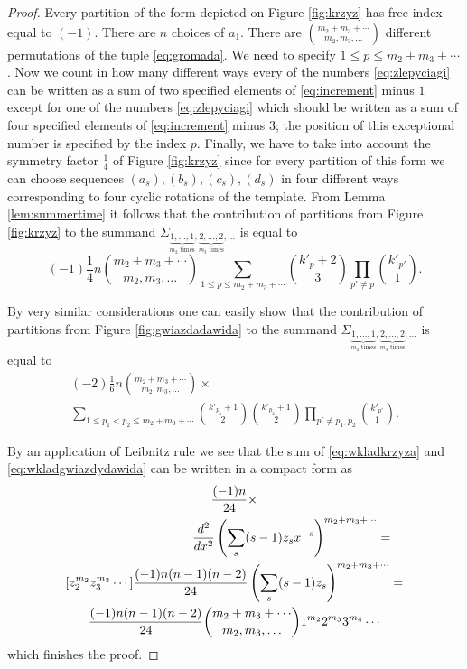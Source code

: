 \documentclass[12pt,dvips]{amsart}
\numberwithin{equation}{section} \numberwithin{figure}{section}
\theoremstyle{plain}
\theoremstyle{definition}
\theoremstyle{remark}
\begin{document}
\begin{proof}
Every partition of the form depicted on Figure \ref{fig:krzyz} has
free index equal to $(-1)$. There are $n$ choices of $a_1$. There
are $\binom{m_2+m_3+\cdots}{m_2,m_3,\dots}$ different permutations
of the tuple \eqref{eq:gromada}. We need to specify $1\leq p\leq
m_2+m_3+\cdots$. Now we count in how many different ways every of
the numbers \eqref{eq:zlepyciagi} can be written as a sum of two
specified elements of \eqref{eq:increment} minus $1$ except for one
of the numbers \eqref{eq:zlepyciagi} which should be written as a
sum of four specified elements of \eqref{eq:increment} minus $3$;
the position of this exceptional number is specified by the index
$p$. Finally, we have to take into account the symmetry factor
$\frac{1}{4}$ of Figure \ref{fig:krzyz} since for every partition of
this form we can choose sequences $(a_s),(b_s),(c_s),(d_s)$ in four
different ways corresponding to four cyclic rotations of the
template. From Lemma \ref{lem:summertime} it follows that the
contribution of partitions from Figure \ref{fig:krzyz} to the
summand $\Sigma_{\underbrace{1,\dots,1}_{m_2\text{ times}},
\underbrace{2,\dots,2}_{m_3\text{ times}},\dots}$ is equal to
\begin{equation}
\label{eq:wkladkrzyza}(-1) \frac{1}{4} n
\binom{m_2+m_3+\cdots}{m_2,m_3,\dots} \sum_{1\leq p \leq
m_2+m_3+\cdots} \binom{k'_p+2}{3} \prod_{p'\neq p}
\binom{k'_{p'}}{1}.
\end{equation}

By very similar considerations one can easily show that the
contribution of partitions from Figure \ref{fig:gwiazdadawida} to
the summand $\Sigma_{\underbrace{1,\dots,1}_{m_2\text{ times}},
\underbrace{2,\dots,2}_{m_3\text{ times}},\dots}$ is equal to
\begin{multline}
\label{eq:wkladgwiazdydawida}
(-2)\frac{1}{6} n \binom{m_2+m_3+\cdots}{m_2,m_3,\dots} \times \\
\sum_{1\leq p_1<p_2 \leq m_2+m_3+\cdots} \binom{k'_{p_1}+1}{2}
\binom{k'_{p_2}+1}{2} \prod_{p'\neq p_1,p_2} \binom{k'_{p'}}{1}.
\end{multline}

By an application of Leibnitz rule we see that the sum of
\eqref{eq:wkladkrzyza} and \eqref{eq:wkladgwiazdydawida} can be
written in a compact form as
\begin{multline*}
 [x^{-(2m_2+3m_3+\cdots)-2} z_2^{m_2} z_3^{m_3} \cdots] \frac{(-1) n}{24}
\times \\
\shoveright{\frac{d^2}{dx^2} \left( \sum_{s}  (s-1) z_s x^{-s}
\right)^
{m_2+m_3+\cdots}=} \\
[z_2^{m_2} z_3^{m_3} \cdots] \frac{(-1)n(n-1)(n-2)}{24}
\left( \sum_{s}  (s-1) z_s \right)^
{m_2+m_3+\cdots}=\\
\frac{(-1)n(n-1)(n-2)}{24} \binom{m_2+m_3+\cdots}{m_2,m_3,\dots}
1^{m_2} 2^{m_3} 3^{m_4} \cdots
\end{multline*}
which finishes the proof.
\end{proof}
\end{document}
